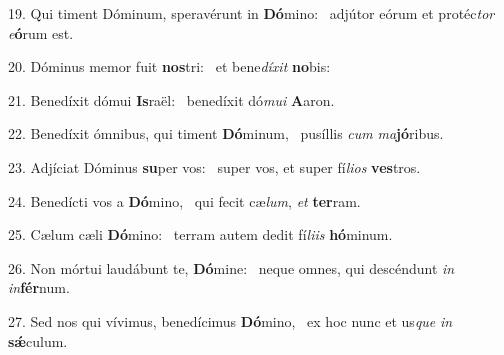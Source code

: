 19. Qui timent Dóminum, speravérunt in \textbf{Dó}mino: \ast\  adjútor eórum et protéc\textit{tor} \textit{e}\textbf{ó}rum est.\

20. Dóminus memor fuit \textbf{nos}tri: \ast\  et bene\textit{dí}\textit{xit} \textbf{no}bis:\

21. Benedíxit dómui \textbf{Is}raël: \ast\  benedíxit dó\textit{mu}\textit{i} \textbf{A}aron.\

22. Benedíxit ómnibus, qui timent \textbf{Dó}minum, \ast\  pusíllis \textit{cum} \textit{ma}\textbf{jó}ribus.\

23. Adjíciat Dóminus \textbf{su}per vos: \ast\  super vos, et super fí\textit{li}\textit{os} \textbf{ves}tros.\

24. Benedícti vos a \textbf{Dó}mino, \ast\  qui fecit cæ\textit{lum}, \textit{et} \textbf{ter}ram.\

25. Cælum cæli \textbf{Dó}mino: \ast\  terram autem dedit fí\textit{li}\textit{is} \textbf{hó}minum.\

26. Non mórtui laudábunt te, \textbf{Dó}mine: \ast\  neque omnes, qui descéndunt \textit{in} \textit{in}\textbf{fér}num.\

27. Sed nos qui vívimus, benedícimus \textbf{Dó}mino, \ast\  ex hoc nunc et us\textit{que} \textit{in} \textbf{sǽ}culum.\

